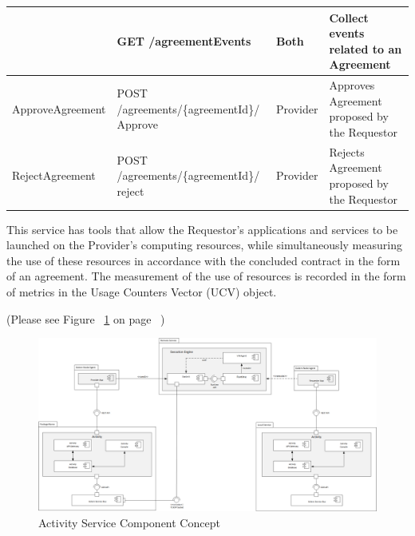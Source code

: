 \begin{enumerate}
\begin{enumerate}
\begin{table}[H]
\begin{center}
\begin{tabular}{|p{3cm}|p{7cm}|p{1.5cm}|p{4cm}|}
					& GET /agreementEvents											& Both 		& 	Collect events related to an Agreement \\
\hline

ApproveAgreement	& POST /agreements/\{agreementId\}/ \newline Approve			& Provider	&	Approves Agreement proposed by the Requestor \\
\hline

RejectAgreement		& POST /agreements/\{agreementId\}/ \newline reject				& Provider	&	Rejects Agreement proposed by the Requestor	\\
\hline

\end{tabular}
\end{center}
\end{table}

\end{enumerate}

\end{enumerate}



This service has tools that allow the Requestor's applications and services to be launched on the Provider's computing resources,
while simultaneously measuring the use of these resources in accordance with the concluded contract in the form of an agreement. 
The measurement of the use of resources is recorded in the form of metrics in the Usage Counters Vector (UCV) object.


(Please see Figure ~\ref{fig:ASCC} on page ~\pageref{fig:ASCC})

\begin{figure}[H]
    \centering
    \includegraphics[width=14cm,angle=0]{./diag/Reference/ActivityService-Reference.png}
	\caption{Activity Service Component Concept}
    \label{fig:ASCC}
\end{figure}



